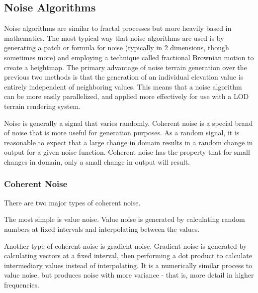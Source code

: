 \subsection{Noise Algorithms}

Noise algorithms are similar to fractal processes but more heavily based in mathematics.
The most typical way that noise algorithms are used is by generating a patch or formula for noise (typically in 2 dimensions, though sometimes more) and employing a technique called fractional Brownian motion to create a heightmap.
The primary advantage of noise terrain generation over the previous two methods is that the generation of an individual elevation value is entirely independent of neighboring values.
This means that a noise algorithm can be more easily parallelized, and applied more effectively for use with a LOD terrain rendering system.

Noise is generally a signal that varies randomly.
Coherent noise is a special brand of noise that is more useful for generation purposes.
As a random signal, it is reasonable to expect that a large change in domain results in a random change in output for a given noise function.
Coherent noise has the property that for small changes in domain, only a small change in output will result.



\subsubsection{Coherent Noise}

There are two major types of coherent noise.


The most simple is value noise.
Value noise is generated by calculating random numbers at fixed intervals and interpolating between the values.



Another type of coherent noise is gradient noise.
Gradient noise is generated by calculating vectors at a fixed interval, then performing a dot product to calculate intermediary values instead of interpolating.
It is a numerically similar process to value noise, but produces noise with more variance - that is, more detail in higher frequencies.

